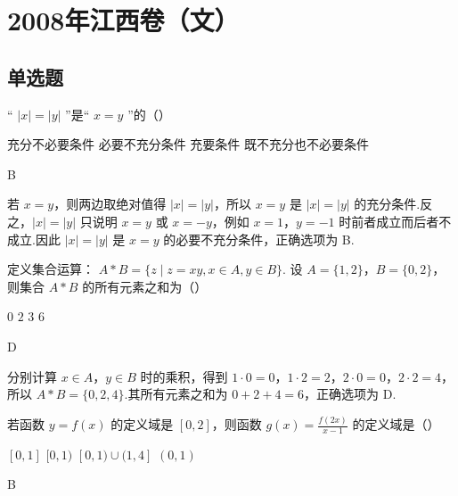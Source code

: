 \chapter{2008年江西卷（文）}

\section{单选题}

\begin{problem}
“ \( |x| = |y| \) ”是“ \( x = y \) ”的（\quad）

\choices
    {充分不必要条件}
    {必要不充分条件}
    {充要条件}
    {既不充分也不必要条件}
\end{problem}

\begin{answer}
B
\end{answer}

\begin{solution}
若 \(x=y\)，则两边取绝对值得 \( |x|=|y| \)，所以 \(x=y\) 是 \( |x|=|y| \) 的充分条件.反之，\( |x|=|y| \) 只说明 \(x=y\) 或 \(x=-y\)，例如 \(x=1\)，\(y=-1\) 时前者成立而后者不成立.因此 \( |x|=|y| \) 是 \(x=y\) 的必要不充分条件，正确选项为 B.
\end{solution}

\begin{problem}
定义集合运算： \( A * B = \{z \mid z = xy, x \in A, y \in B\} \). 设 \( A = \{1, 2\} \)，\( B = \{0, 2\} \)，则集合 \( A * B \) 的所有元素之和为（\quad）

\choices
    {\(0\)}
    {\(2\)}
    {\(3\)}
    {\(6\)}
\end{problem}

\begin{answer}
D
\end{answer}

\begin{solution}
分别计算 \(x\in A\)，\(y\in B\) 时的乘积，得到 \(1\cdot0=0\)，\(1\cdot2=2\)，\(2\cdot0=0\)，\(2\cdot2=4\)，所以 \(A*B=\{0,2,4\}\).其所有元素之和为 \(0+2+4=6\)，正确选项为 D.
\end{solution}

\begin{problem}
若函数 \( y = f(x) \) 的定义域是 \([0, 2]\)，则函数 \( g(x) = \frac{f(2x)}{x - 1} \) 的定义域是（\quad）

\choices
    {\([0,1]\)}
    {\([0,1)\)}
    {\([0,1)\cup (1,4]\)}
    {\((0,1)\)}
\end{problem}

\begin{answer}
B
\end{answer}

